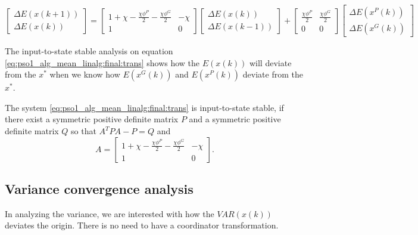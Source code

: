 \begin{equation}
\label{eq:pso1_alg_mean_linalg:final:trans}
\begin{bmatrix}
\Delta E( x(k+1) ) \\
\Delta E( x(k) )
\end{bmatrix}
=
\begin{bmatrix}
1 + \chi - \frac{ \chi \phi^{P} }{2} - \frac{ \chi \phi^{G} }{2} & -\chi \\
1 & 0
\end{bmatrix}
\begin{bmatrix}
\Delta E( x(k) ) \\
\Delta E( x(k-1) )
\end{bmatrix}
+
\begin{bmatrix}
\frac{ \chi \phi^{P} }{2} & \frac{ \chi \phi^{G} }{2} \\
0 & 0
\end{bmatrix}
\begin{bmatrix}
\Delta E( x^{P}(k) ) \\
\Delta E( x^{G}(k) )
\end{bmatrix}
\end{equation}

The input-to-state stable analysis on equation \eqref{eq:pso1_alg_mean_linalg:final:trans} shows how the $ E(x(k)) $ will deviate from the $ x^{*} $ when we know how $ E( x^{G}(k) ) $ and $ E( x^{P}(k) ) $ deviate from the $ x^{*} $.
\begin{mythm}
The system \eqref{eq:pso1_alg_mean_linalg:final:trans} is input-to-state stable, if there exist a symmetric positive definite matrix $ P $ and a symmetric positive definite matrix $ Q $ so that
$ A^{T} P A - P = Q $ and
\begin{equation}
A =
\begin{bmatrix}
1 + \chi - \frac{ \chi \phi^{P} }{2} - \frac{ \chi \phi^{G} }{2} & -\chi \\
1 & 0
\end{bmatrix}.
\end{equation}
\end{mythm}


\subsection{Variance convergence analysis}

In analyzing the variance, we are interested with how the $ VAR(x(k)) $ deviates the origin.
There is no need to have a coordinator transformation.


